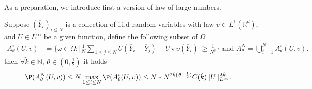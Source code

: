 As a preparation, we introduce first a version of law of large numbers.

\begin{lemma}[A version of l.l.n]\label{version_of_lln}
	Suppose $(\overline{Y}_i )_{i \le N}$ is a collection of i.i.d random variables with law $v \in  L^{1}(\mathbb{R}^{d} ) $,
	and $U \in  L^{\infty} $ be a given function, define the following subset of $\Omega$
	\begin{align*}
	A_{\theta }^{i} (U,v) &= \Big\{\omega \in  \Omega  : \Big|\frac{1}{N} \sum_{1\leq j\leq N} U(\overline{Y}_i - \overline{Y}_j  )- U \star  v (\overline{Y}_i )\Big| \ge \frac{1}{N^{\theta} }\Big\}  
\mbox{ and }	A_{\theta }^{N}= \bigcup_{i=1}^{N}   A_{\theta }^{i} (U,v)
	.\end{align*}
	then $\forall  \tilde{k} \in  \mathbb{N} $, $\theta \in  (0,\frac{1}{2})$ it holds 
	\begin{align*}
	\P(A_{\theta }^{N}(U,v) ) &\le N \max_{1\le i \le  N} \P(A_{\theta }^{i}(U,v) )\le N * N^{2 \tilde{k}(\theta  - \frac{1}{2}) }  C(\tilde{k} ) \|U\|_{L^{\infty} }^{2 \tilde{k} } 
	.\end{align*}
\end{lemma}
